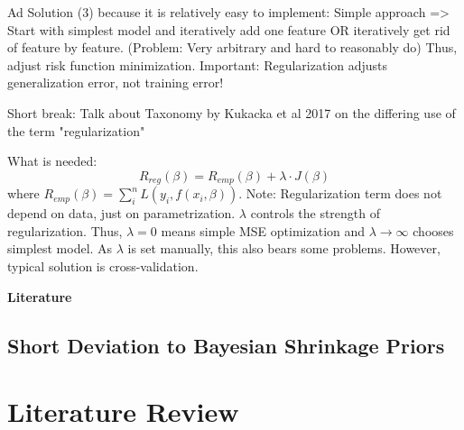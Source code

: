 \documentclass[12pt,a4paper]{article}
\newenvironment{lightbluebox}{%
    \begin{tcolorbox}[colback=lightblue, colframe=lightblue, fontupper=\itshape]%
}{%
    \end{tcolorbox}%
}
\begin{document}
\begin{lightbluebox}
Ad Solution (3) because it is relatively easy to implement: Simple approach => Start with simplest model and iteratively add one feature OR iteratively get rid of feature by feature. (Problem: Very arbitrary and hard to reasonably do) Thus, adjust risk function minimization. Important: Regularization adjusts generalization error, not training error!

Short break: Talk about Taxonomy by Kukacka et al 2017 on the differing use of the term "regularization" 

What is needed: 
\[
R_{reg}(\beta) = R_{emp}(\beta)+ \lambda \cdot J(\beta)
\]
where $R_{emp}(\beta) = \sum_i^n L(y_i, f(x_i, \beta))$. Note: Regularization term does not depend on data, just on parametrization. $\lambda$ controls the strength of regularization. Thus, $\lambda = 0$ means simple MSE optimization and $\lambda \to \infty$ chooses simplest model. As $\lambda$ is set manually, this also bears some problems. However, typical solution is cross-validation. 

\textbf{Literature}
\parencite{Taxonomy2017}
\end{lightbluebox}

\subsection{Short Deviation to Bayesian Shrinkage Priors}

\newpage

\section{Literature Review}
\end{document}

